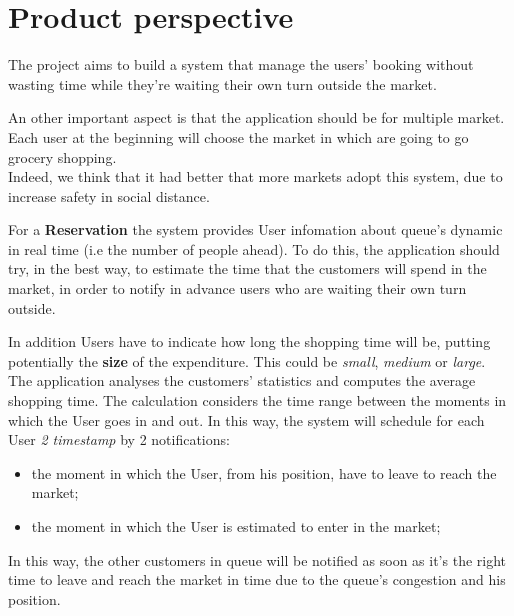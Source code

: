 \section{Product perspective}

The project aims to build a system that manage the users’ booking without wasting time while they're waiting their own turn outside the market. 
\par
An other important aspect is that the application should be for multiple market. Each user at the beginning will choose the market in which are going to go grocery shopping.\\
Indeed, we think that it had better that more markets adopt this system, due to increase safety in social distance.
\par
For a \textbf{Reservation} the system provides User infomation about queue's dynamic in real time (i.e the number of people ahead). 
To do this, the application should try, in the best way, to estimate the time that the customers will spend in the market, in order to notify in advance users who are waiting their own turn outside. 



In addition Users have to indicate how long the shopping time will be, putting potentially the \textbf{size} of the expenditure. This could be \textit{small}, \textit{medium} or \textit{large}.
\\
The application analyses the customers’ statistics and computes the average shopping time.
The calculation considers the time range between the moments in which the User goes in and out.  
In this way, the system will schedule for each User \textit{2 timestamp} by 2 notifications:
\begin{itemize}
\item the moment in which the User, from his position, have to leave to reach the market;
\item the moment in which the User is estimated to enter in the market;
\end{itemize}



In this way, the other customers in queue will be notified as soon as it's the right time to leave and reach the market in time due to the queue's congestion and his position.  

